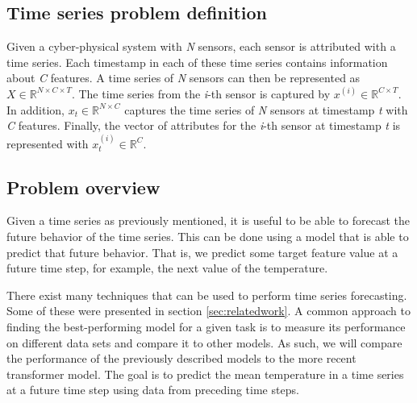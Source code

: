 \subsection{Time series problem definition}
Given a cyber-physical system with \textit{N} sensors, each sensor is attributed with a time series.
Each timestamp in each of these time series contains information about \textit{C} features.
A time series of \textit{N} sensors can then be represented as \(X \in \mathbb{R}^{N \times C \times T}\).
The time series from the \textit{i}-th sensor is captured by \(x^{(i)} \in \mathbb{R}^{C \times T} \).
In addition, \(x_{t} \in \mathbb{R}^{N \times C}\) captures the time series of \textit{N} sensors at timestamp \textit{t} with \textit{C} features.
Finally, the vector of attributes for the \textit{i}-th sensor at timestamp \textit{t} is represented with \(x_{t}^{(i)} \in \mathbb{R}^{C}\). \cite{cirsteaEnhanceNetPluginNeural2021}


\subsection{Problem overview}
Given a time series as previously mentioned, it is useful to be able to forecast the future behavior of the time series.
This can be done using a model that is able to predict that future behavior.
That is, we predict some target feature value at a future time step, for example, the next value of the temperature.


There exist many techniques that can be used to perform time series forecasting. Some of these were presented in section \ref{sec:relatedwork}.
A common approach to finding the best-performing model for a given task is to measure its performance on different data sets and compare it to other models.
As such, we will compare the performance of the previously described models to the more recent transformer model.
The goal is to predict the mean temperature in a time series at a future time step using data from preceding time steps.